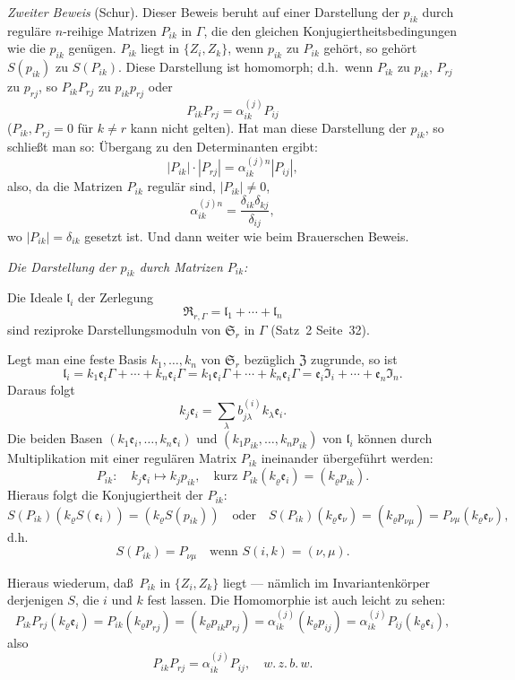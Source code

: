 \documentclass[12pt,a4paper]{article}
\theoremstyle{plain}
\theoremstyle{definition}
\theoremstyle{remark}
\newcommand{\wzbw}{w.\,z.\,b.\,w.}
\begin{document}
\textit{Zweiter Beweis} (Schur). Dieser Beweis beruht auf einer Darstellung der
$p_{ik}$ durch regul\"are $n$-reihige Matrizen $P_{ik}$ in $\varGamma$, die den gleichen
Konjugiertheitsbedingungen wie die $p_{ik}$ gen\"ugen. $P_{ik}$ liegt in
$\{Z_{i}, Z_{k}\}$, wenn $p_{ik}$ zu $P_{ik}$ geh\"ort, so geh\"ort $S(p_{ik})$ zu
$S(P_{ik})$. Diese Darstellung ist homomorph; d.h.\ wenn $P_{ik}$ zu $p_{ik}$,
$P_{rj}$ zu $p_{rj}$, so $P_{ik}P_{rj}$ zu $p_{ik}p_{rj}$ oder
\[
P_{ik}P_{rj} = \alpha_{ik}^{(j)}P_{ij}
\]
($P_{ik}, P_{rj} = 0$ f\"ur $k \neq r$ kann nicht gelten). Hat man diese Darstellung
der $p_{ik}$, so schlie\ss t man so: \"Ubergang zu den Determinanten ergibt:
\[
|P_{ik}| \cdot |P_{rj}| = \alpha_{ik}^{(j)n} |P_{ij}|,
\]
also, da die Matrizen $P_{ik}$ regul\"ar sind, $|P_{ik}| \neq 0$,
\[
\alpha_{ik}^{(j)n} = \frac{\delta_{ik}\delta_{kj}}{\delta_{ij}},
\]
wo $|P_{ik}| = \delta_{ik}$ gesetzt ist. Und dann weiter wie beim Brauerschen Beweis.

\textit{Die Darstellung der $p_{ik}$ durch Matrizen $P_{ik}$:}

Die Ideale $\mathfrak{l}_{i}$ der Zerlegung
\[
\mathfrak{R}_{r,\varGamma} = \mathfrak{l}_{1} + \cdots + \mathfrak{l}_{n}
\]
sind reziproke Darstellungsmoduln von $\mathfrak{S}_{r}$ in $\varGamma$ (Satz~2 Seite~32).

Legt man eine feste Basis $k_{1}, \ldots, k_{n}$ von $\mathfrak{S}_{r}$ bez\"uglich $\mathfrak{Z}$ zugrunde,
so ist
\[
\mathfrak{l}_{i} = k_{1}\mathfrak{e}_{i}\varGamma + \cdots + k_{n}\mathfrak{e}_{i}\varGamma
= k_{1}\mathfrak{e}_{i}\varGamma + \cdots + k_{n}\mathfrak{e}_{i}\varGamma
= \mathfrak{e}_{i}\mathfrak{I}_{i} + \cdots + \mathfrak{e}_{n}\mathfrak{I}_{n}.
\]
Daraus folgt
\[
k_{j}\mathfrak{e}_{i} = \sum_{\lambda} b_{j\lambda}^{(i)}k_{\lambda}\mathfrak{e}_{i}.
\]
Die beiden Basen $(k_{1}\mathfrak{e}_{i}, \ldots, k_{n}\mathfrak{e}_{i})$ und $(k_{1}p_{ik}, \ldots, k_{n}p_{ik})$
von $\mathfrak{l}_{i}$ k\"onnen durch Multiplikation mit einer regul\"aren Matrix $P_{ik}$
ineinander \"ubergef\"uhrt werden:
\[
P_{ik}: \quad k_{j}\mathfrak{e}_{i} \mapsto k_{j}p_{ik}, \quad \text{kurz } P_{ik}(k_{\varrho}\mathfrak{e}_{i}) = (k_{\varrho}p_{ik}).
\]
Hieraus folgt die Konjugiertheit der $P_{ik}$:
\[
S(P_{ik})(k_{\varrho}S(\mathfrak{e}_{i})) = (k_{\varrho}S(p_{ik})) \quad \text{oder} \quad
S(P_{ik})(k_{\varrho}\mathfrak{e}_{\nu}) = (k_{\varrho}p_{\nu\mu}) = P_{\nu\mu}(k_{\varrho}\mathfrak{e}_{\nu}),
\]
d.h.
\[
S(P_{ik}) = P_{\nu\mu} \quad \text{wenn } S(i,k) = (\nu,\mu).
\]

Hieraus wiederum, da\ss\ $P_{ik}$ in $\{Z_{i}, Z_{k}\}$ liegt --- n\"amlich im
Invariantenk\"orper derjenigen $S$, die $i$ und $k$ fest lassen. Die Homomorphie
ist auch leicht zu sehen:
\[
P_{ik}P_{rj}(k_{\varrho}\mathfrak{e}_{i}) = P_{ik}(k_{\varrho}p_{rj}) = (k_{\varrho}p_{ik}p_{rj})
= \alpha_{ik}^{(j)}(k_{\varrho}p_{ij}) = \alpha_{ik}^{(j)}P_{ij}(k_{\varrho}\mathfrak{e}_{i}),
\]
also
\[
P_{ik}P_{rj} = \alpha_{ik}^{(j)}P_{ij}, \quad \wzbw
\]
\end{document}
